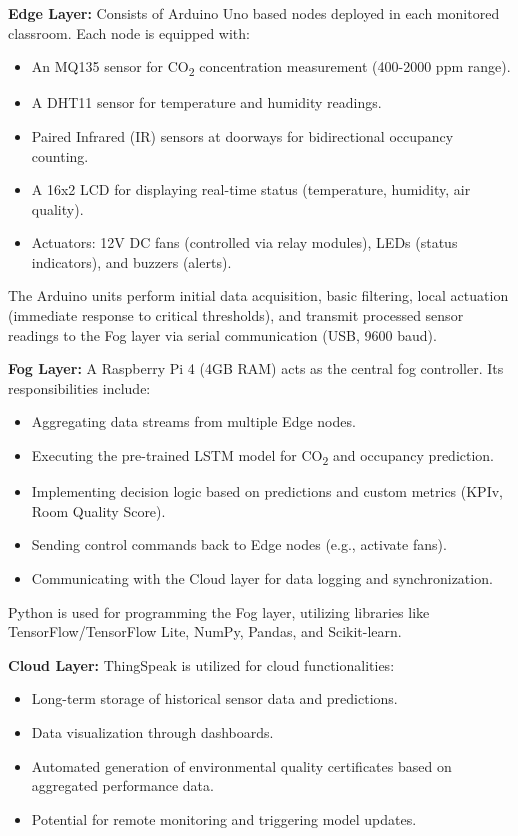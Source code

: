 \textbf{Edge Layer:} Consists of Arduino Uno based nodes deployed in each monitored classroom. Each node is equipped with:
\begin{itemize}
    \item An MQ135 sensor for CO\textsubscript{2} concentration measurement (400-2000 ppm range).
    \item A DHT11 sensor for temperature and humidity readings.
    \item Paired Infrared (IR) sensors at doorways for bidirectional occupancy counting.
    \item A 16x2 LCD for displaying real-time status (temperature, humidity, air quality).
    \item Actuators: 12V DC fans (controlled via relay modules), LEDs (status indicators), and buzzers (alerts).
\end{itemize}
The Arduino units perform initial data acquisition, basic filtering, local actuation (immediate response to critical thresholds), and transmit processed sensor readings to the Fog layer via serial communication (USB, 9600 baud).

\textbf{Fog Layer:} A Raspberry Pi 4 (4GB RAM) acts as the central fog controller. Its responsibilities include:
\begin{itemize}
    \item Aggregating data streams from multiple Edge nodes.
    \item Executing the pre-trained LSTM model for CO\textsubscript{2} and occupancy prediction.
    \item Implementing decision logic based on predictions and custom metrics (KPIv, Room Quality Score).
    \item Sending control commands back to Edge nodes (e.g., activate fans).
    \item Communicating with the Cloud layer for data logging and synchronization.
\end{itemize}
Python is used for programming the Fog layer, utilizing libraries like TensorFlow/TensorFlow Lite, NumPy, Pandas, and Scikit-learn.

\textbf{Cloud Layer:} ThingSpeak is utilized for cloud functionalities:
\begin{itemize}
    \item Long-term storage of historical sensor data and predictions.
    \item Data visualization through dashboards.
    \item Automated generation of environmental quality certificates based on aggregated performance data.
    \item Potential for remote monitoring and triggering model updates.
\end{itemize}

